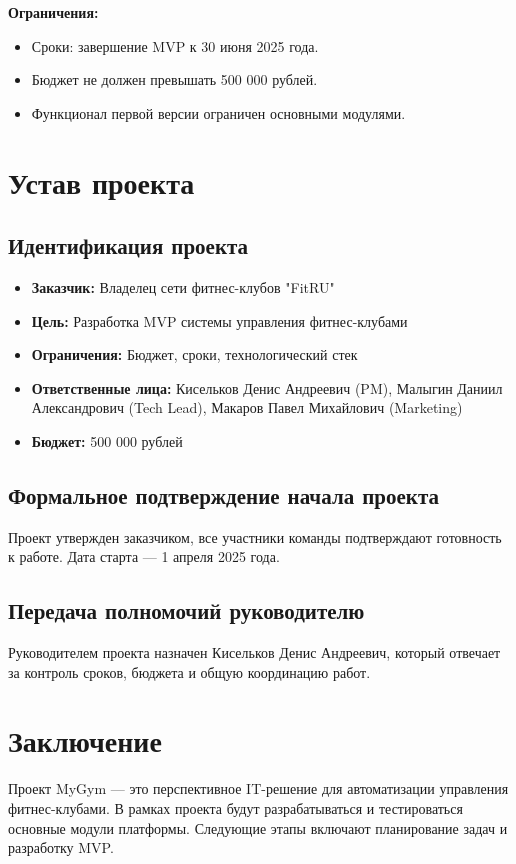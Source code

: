 \documentclass[14pt, russian]{matmex-diploma-custom}
\begin{document}
\textbf{Ограничения:}
\begin{itemize}
    \item Сроки: завершение MVP к 30 июня 2025 года.
    \item Бюджет не должен превышать 500 000 рублей.
    \item Функционал первой версии ограничен основными модулями.
\end{itemize}

\section{Устав проекта}
\subsection{Идентификация проекта}
\begin{itemize}
    \item \textbf{Заказчик:} Владелец сети фитнес-клубов "FitRU"
    \item \textbf{Цель:} Разработка MVP системы управления фитнес-клубами
    \item \textbf{Ограничения:} Бюджет, сроки, технологический стек
    \item \textbf{Ответственные лица:} Кисельков Денис Андреевич (PM), Малыгин Даниил Александрович (Tech Lead), Макаров Павел Михайлович (Marketing)
    \item \textbf{Бюджет:} 500 000 рублей
\end{itemize}

\subsection{Формальное подтверждение начала проекта}
Проект утвержден заказчиком, все участники команды подтверждают готовность к работе. Дата старта — 1 апреля 2025 года.

\subsection{Передача полномочий руководителю}
Руководителем проекта назначен Кисельков Денис Андреевич, который отвечает за контроль сроков, бюджета и общую координацию работ.

\section{Заключение}
Проект MyGym — это перспективное IT-решение для автоматизации управления фитнес-клубами. В рамках проекта будут разрабатываться и тестироваться основные модули платформы. Следующие этапы включают планирование задач и разработку MVP.
\end{document}
